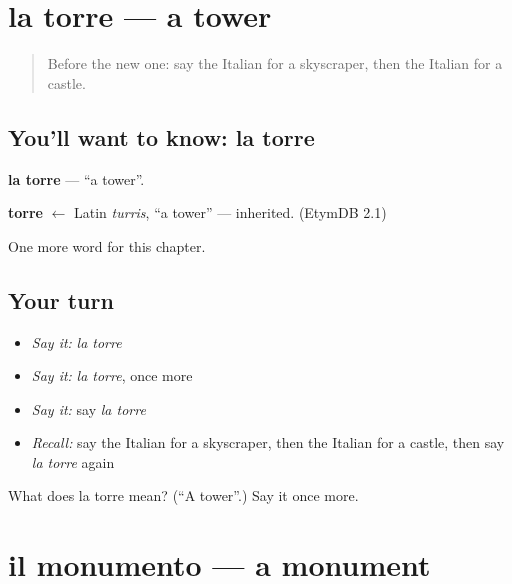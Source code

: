 \section[la torre]{la torre — a tower}

\label{lesson:IT-C228-torre}



\begin{quote}
Before the new one: say the Italian for a skyscraper, then the Italian for a castle.
\end{quote}

\subsection*{You'll want to know: la torre}
\textbf{la torre} — \textquotedblleft{}a tower\textquotedblright{}.

\begin{cousinweb}
\textbf{torre} $\leftarrow$ Latin \emph{turris}, \textquotedblleft{}a tower\textquotedblright{} — inherited. (EtymDB 2.1)
\end{cousinweb}

\begin{grammarlens}[title={What you've built}]
One more word for this chapter.
\end{grammarlens}

\subsection*{Your turn}
\begin{itemize}
\raggedright
  \item \emph{Say it:} \emph{la torre}
  \item \emph{Say it:} \emph{la torre}, once more
  \item \emph{Say it:} say \emph{la torre}
  \item \emph{Recall:} say the Italian for a skyscraper, then the Italian for a castle, then say \emph{la torre} again
\end{itemize}

\begin{tcolorbox}[breakable,colback=teal!4,colframe=teal!35!black,title={Before you move on}]
What does la torre mean? (\textquotedblleft{}A tower\textquotedblright{}.) Say it once more.
\end{tcolorbox}
\section[il monumento]{il monumento — a monument}

